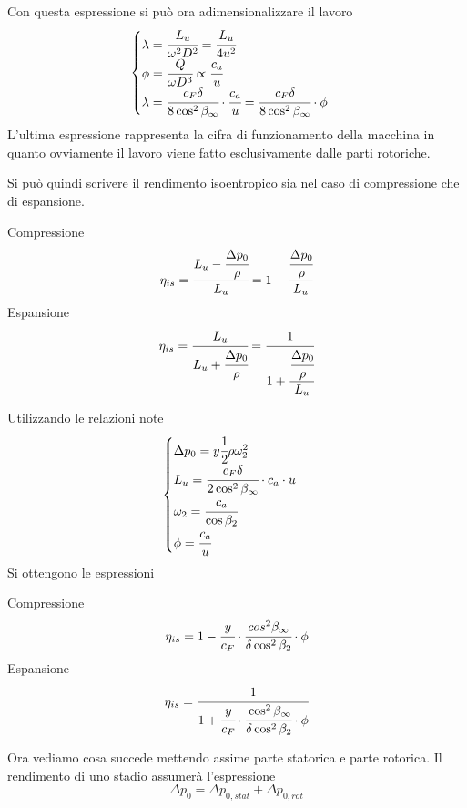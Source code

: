 Con questa espressione si può ora adimensionalizzare il lavoro
\begin{equation}
\begin{cases}
\lambda = \cfrac{L_u}{\omega ^2 D^2} = \cfrac{L_u}{4 u^2}\\
\phi = \cfrac{Q}{\omega D^3} \propto \cfrac{c_a}{u} \\
\lambda = \cfrac{c_F \delta}{8 \cos^2 \beta_{\infty}} \cdot \cfrac{c_a}{u} = \cfrac{c_F \delta}{8 \cos^2 \beta_{\infty}} \cdot \phi
\end{cases}
\end{equation}
L'ultima espressione rappresenta la cifra di funzionamento della macchina in quanto ovviamente il lavoro viene fatto esclusivamente dalle parti rotoriche.

Si può quindi scrivere il rendimento isoentropico sia nel caso di compressione che di espansione. 

\begin{multicols}{2}
Compressione
\begin{equation}
\eta_{is} = \cfrac{L_u - \cfrac{\Delta p_0}{\rho}}{L_u} = 1- \cfrac{\cfrac{\Delta p_0}{\rho}}{L_u}
\end{equation}
\break
Espansione
\begin{equation}
\eta_{is} = \cfrac{L_u}{L_u + \cfrac{\Delta p_0}{\rho}} = \cfrac{1}{1+\cfrac{\cfrac{\Delta p_0}{\rho}}{L_u}}
\end{equation}
\end{multicols}

Utilizzando le relazioni note
\begin{align*}
\begin{cases}
\Delta p_0 = y \cfrac{1}{2} \rho \omega_2^2\\
L_u = \cfrac{c_F \delta}{2 \cos^2 \beta_{\infty}} \cdot c_a \cdot u\\
\omega_2 = \cfrac{c_a}{\cos \beta_2}\\
\phi = \cfrac{c_a}{u}
\end{cases}
\end{align*}
Si ottengono le espressioni
\begin{multicols}{2}
Compressione
\begin{equation}
\eta_{is} = 1- \cfrac{y}{c_F} \cdot  \cfrac{cos^2 \beta_{\infty}}{\delta \cos^2 \beta_2} \cdot \phi
\end{equation}
\break
Espansione
\begin{equation}
\eta_{is} = \cfrac{1}{1+\cfrac{y}{c_F} \cdot \cfrac{\cos^2 \beta_{\infty}}{\delta \cos^2 \beta_2} \cdot \phi}
\end{equation}
\end{multicols}
Ora vediamo cosa succede mettendo assime parte statorica e parte rotorica. Il rendimento di uno stadio assumerà l'espressione
\begin{equation}
\Delta p_0 = \Delta p_{0,stat} + \Delta p_{0,rot}
\end{equation}
